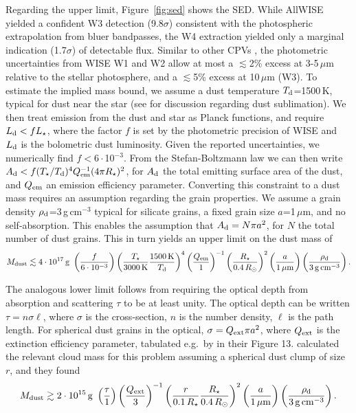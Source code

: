 \documentclass[11pt,twocolumn,tighten,linenumbers]{aastex7}
\begin{document}
Regarding the upper limit, Figure~\ref{fig:sed} shows
the SED.  While AllWISE \citep{Cutri2014} yielded a confident W3
detection (9.8$\sigma$) consistent with the photospheric extrapolation
from bluer bandpasses, the W4 extraction yielded only a marginal
indication (1.7$\sigma$) of detectable flux.  Similar to other CPVs
\citep{Stauffer2017,Bouma2024}, the photometric uncertainties from WISE
W1 and W2 allow at most a $\lesssim$2\% excess at 3-5\,$\mu$m relative
to the stellar photosphere, and a $\lesssim$5\% excess at 10\,$\mu$m
(W3).  To estimate the implied mass bound, we assume a dust
temperature $T_{\rm d}$=1500\,K, typical for dust near the star (see
\citealt{Zhan2019} for discussion regarding dust sublimation).  We then
treat emission from the dust and star as Planck functions, and require
$L_{\rm d} < f L_\star$, where the factor $f$ is set by the
photometric precision of WISE and $L_{\rm d}$ is the bolometric dust
luminosity.  Given the reported uncertainties, we numerically find
$f<6\cdot$10$^{-3}$.  From the Stefan-Boltzmann law we can then write
$A_{\rm d} < f (T_\star / T_{\rm d})^4 Q_{\rm em}^{-1} (4\pi
R_\star)^2$, for $A_{\rm d}$ the total emitting surface area of the
dust, and $Q_{\rm em}$ an emission efficiency parameter.  Converting
this constraint to a dust mass requires an assumption regarding the
grain properties.  We assume a grain density $\rho_{\rm
d}$=3\,g\,cm$^{-3}$ typical for silicate grains, a fixed grain size
$a$=1\,$\mu$m, and no self-absorption.  This enables the assumption
that $A_{\rm d} = N \pi a^2$, for $N$ the total number of dust grains.
This in turn yields an upper limit on the dust mass of
\begin{equation}
  M_{\rm dust} \lesssim 4 \cdot 10^{17}\, {\rm g}\ 
  \left( \frac{f}{6\cdot10^{-3}} \right)
  \left( \frac{T_\star}{3000\,{\rm K}} \frac{1500\,{\rm K}}{T_{\rm d}} \right)^4
  \left( \frac{Q_{\rm em}}{1} \right)^{-1}
  \left( \frac{R_\star}{0.4\,R_\odot} \right)^2
  \left( \frac{a}{1\,\mathrm{\mu m}} \right)
  \left( \frac{\rho_{\rm d}}{3\,\mathrm{g\,cm^{-3}}} \right).
\end{equation}

The analogous lower limit follows from requiring the optical depth
from absorption and scattering $\tau$ to be at least unity.  The
optical depth can be written $\tau = n \sigma \ell$, where $\sigma$ is
the cross-section, $n$ is the number density, $\ell$ is the path
length.  For spherical dust grains in the optical, $\sigma = Q_{\rm
ext} \pi a^2$, where $Q_{\rm ext}$ is the extinction efficiency
parameter, tabulated e.g.~by \citet{Croll2014} in their Figure 13.
\citet{Sanderson2023} calculated the relevant cloud mass for this
problem assuming a spherical dust clump of size $r$, and they found
\begin{equation}
  M_{\rm dust} \gtrsim 2 \cdot 10^{15}\, {\rm g}\ 
  \left( \frac{\tau}{1} \right)
  \left( \frac{Q_{\rm ext}}{3} \right)^{-1}
  \left( \frac{r}{0.1\,R_\star} \frac{R_\star}{0.4\,R_\odot} \right)^2
  \left( \frac{a}{1\,\mathrm{\mu m}} \right)
  \left( \frac{\rho_{\rm d}}{3\,\mathrm{g\,cm^{-3}}} \right).
\end{equation}
\end{document}

